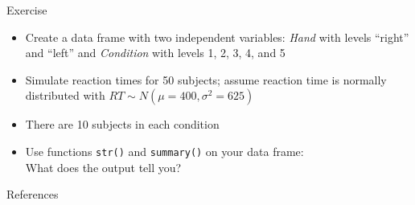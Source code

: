 \documentclass[aspectratio=169]{beamer}
\begin{document}
\begin{frame}{}
  \begin{block}{Exercise}
    \begin{itemize} 
      \item Create a data frame with two independent variables: {\it Hand}
        with levels ``right'' and ``left'' and {\it Condition} with levels
        1, 2, 3, 4, and 5
      \item Simulate reaction times for 50 subjects; assume
        reaction time is normally distributed with $RT \sim
        N(\mu=400,\sigma^2=625)$
      \item There are 10 subjects in each condition
      \item Use functions \texttt{str()} and \texttt{summary()} on your
        data frame:\\
        What does the output tell you?
    \end{itemize}
  \end{block}
\end{frame}


\appendix

\begin{frame}{References}
  \printbibliography
\vfill
\end{frame}
\end{document}
